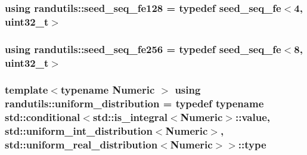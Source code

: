 \subsubsection[{\texorpdfstring{seed\+\_\+seq\+\_\+fe128}{seed_seq_fe128}}]{\setlength{\rightskip}{0pt plus 5cm}using {\bf randutils\+::seed\+\_\+seq\+\_\+fe128} = typedef {\bf seed\+\_\+seq\+\_\+fe}$<$4, uint32\+\_\+t$>$}\hypertarget{namespacerandutils_a2b7c80226592f2cfc2dd51ef1b6a6648}{}\label{namespacerandutils_a2b7c80226592f2cfc2dd51ef1b6a6648}
\subsubsection[{\texorpdfstring{seed\+\_\+seq\+\_\+fe256}{seed_seq_fe256}}]{\setlength{\rightskip}{0pt plus 5cm}using {\bf randutils\+::seed\+\_\+seq\+\_\+fe256} = typedef {\bf seed\+\_\+seq\+\_\+fe}$<$8, uint32\+\_\+t$>$}\hypertarget{namespacerandutils_ab264470d8fc7505e72c78a33528108bd}{}\label{namespacerandutils_ab264470d8fc7505e72c78a33528108bd}
\subsubsection[{\texorpdfstring{uniform\+\_\+distribution}{uniform_distribution}}]{\setlength{\rightskip}{0pt plus 5cm}template$<$typename Numeric $>$ using {\bf randutils\+::uniform\+\_\+distribution} = typedef typename std\+::conditional$<$std\+::is\+\_\+integral$<$Numeric$>$\+::value, std\+::uniform\+\_\+int\+\_\+distribution$<$Numeric$>$, std\+::uniform\+\_\+real\+\_\+distribution$<$Numeric$>$$>$\+::type}\hypertarget{namespacerandutils_ad441b52b9359829bc0e396b1eb484953}{}\label{namespacerandutils_ad441b52b9359829bc0e396b1eb484953}
